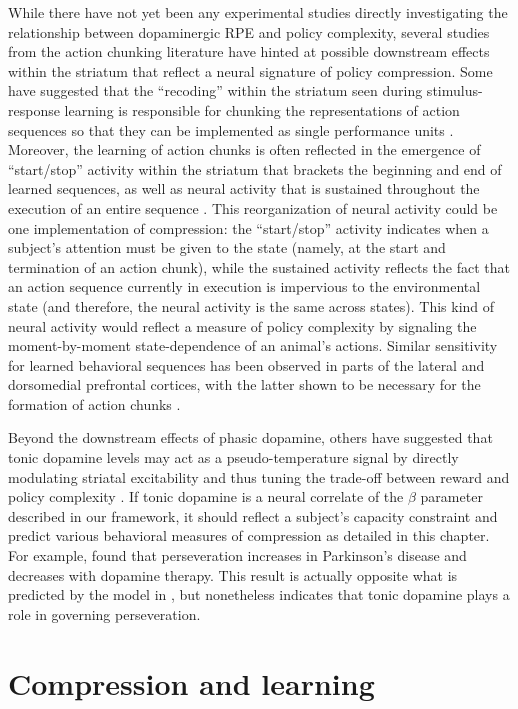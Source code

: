 \documentclass[11pt]{article}
\begin{document}
While there have not yet been any experimental studies directly investigating the relationship between dopaminergic RPE and policy complexity, several studies from the action chunking literature have hinted at possible downstream effects within the striatum that reflect a neural signature of policy compression. Some have suggested that the ``recoding'' within the striatum seen during stimulus-response learning is responsible for chunking the representations of action sequences so that they can be implemented as single performance units \citep{graybiel98}. Moreover, the learning of action chunks is often reflected in the emergence of ``start/stop'' activity within the striatum that brackets the beginning and end of learned sequences, as well as neural activity that is sustained throughout the execution of an entire sequence \citep{Graybiel1998-sw,Smith2013-ji,jin10,jin14}. This reorganization of neural activity could be one implementation of compression: the ``start/stop'' activity indicates when a subject's attention must be given to the state (namely, at the start and termination of an action chunk), while the sustained activity reflects the fact that an action sequence currently in execution is impervious to the environmental state (and therefore, the neural activity is the same across states). This kind of neural activity would reflect a measure of policy complexity by signaling the moment-by-moment state-dependence of an animal's actions. Similar sensitivity for learned behavioral sequences has been observed in parts of the lateral and dorsomedial prefrontal cortices, with the latter shown to be necessary for the formation of action chunks \citep{Shima2007-ps,ostlund09}. 

Beyond the downstream effects of phasic dopamine, others have suggested that tonic dopamine levels may act as a pseudo-temperature signal by directly modulating striatal excitability and thus tuning the trade-off between reward and policy complexity \citep{parush11}. If tonic dopamine is a neural correlate of the $\beta$ parameter described in our framework, it should reflect a subject's capacity constraint and predict various  behavioral measures of compression as detailed in this chapter. For example, \citet{rutledge09} found that perseveration increases in Parkinson's disease and decreases with dopamine therapy. This result is actually opposite what is predicted by the model in \citet{parush11}, but nonetheless indicates that tonic dopamine plays a role in governing perseveration.

\section{Compression and learning}
\end{document}
